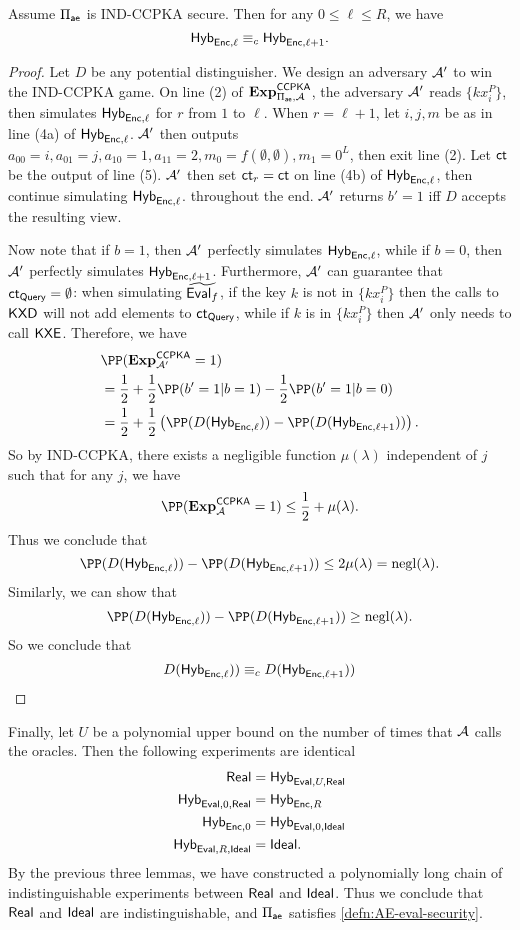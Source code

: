 \begin{lemma}
    Assume $\Pi_{\mathsf{ae}}$ is IND-CCPKA secure. Then for any $0 \leq \ell \leq R$, we have
    $$\mathsf{Hyb}_{\mathsf{Enc}, \ell} \equiv_c \mathsf{Hyb}_{\mathsf{Enc}, \ell + 1}.$$
\end{lemma}
\begin{proof}
    Let $D$ be any potential distinguisher. We design an adversary $\mathcal{A}'$ to win the IND-CCPKA game. On line (2) of $\mathbf{Exp}^{\mathsf{CCPKA}}_{\Pi_{\mathsf{ae}}, \mathcal{A}}$, the adversary $\mathcal{A}'$ reads $\{kx_i^P\}$, then simulates $\mathsf{Hyb}_{\mathsf{Enc}, \ell}$ for $r$ from $1$ to $\ell$. When $r = \ell + 1$, let $i, j, m$ be as in line (4a) of $\mathsf{Hyb}_{\mathsf{Enc}, \ell}$. $\mathcal{A}'$ then outputs $a_{00} = i, a_{01} = j, a_{10} = 1, a_{11} = 2, m_0 = f(\emptyset, \emptyset), m_1 = 0^L$, then exit line (2). Let $\mathsf{ct}$ be the output of line (5). $\mathcal{A}'$ then set $\mathsf{ct}_r = \mathsf{ct}$ on line (4b) of $\mathsf{Hyb}_{\mathsf{Enc}, \ell}$, then continue simulating $\mathsf{Hyb}_{\mathsf{Enc}, \ell}$. throughout the end. $\mathcal{A}'$ returns $b' = 1$ iff $D$ accepts the resulting view.

     Now note that if $b = 1$, then $\mathcal{A}'$ perfectly simulates $\mathsf{Hyb}_{\mathsf{Enc}, \ell}$, while if $b = 0$, then $\mathcal{A}'$ perfectly simulates $\mathsf{Hyb}_{\mathsf{Enc}, \ell+1}$. Furthermore, $\mathcal{A}'$ can guarantee that $\mathsf{ct}_{\mathsf{Query}} = \emptyset$: when simulating $\widetilde{\mathsf{Eval}_f}$, if the key $k$ is not in $\{kx_i^P\}$ then the calls to $\mathsf{KXD}$ will not add elements to $\mathsf{ct}_{\mathsf{Query}}$, while if $k$ is in $\{kx_i^P\}$ then $\mathcal{A}'$ only needs to call $\mathsf{KXE}$. Therefore, we have
    \begin{align*}
     &\PP(\mathbf{Exp}^{\mathsf{CCPKA}}_{ \cA'} = 1) \\
     &= \frac{1}{2} + \frac{1}{2}\PP(b' = 1 | b = 1) - \frac{1}{2}\PP(b' = 1 | b = 0) \\   
     &= \frac{1}{2} + \frac{1}{2}\left(\PP(D(\Hyb_{\enc, \ell})) - \PP(D(\Hyb_{\enc, \ell+1}))\right).
    \end{align*}
    So by IND-CCPKA, there exists a negligible function $\mu(\lambda)$ independent of $j$ such that for any $j$, we have
    $$\PP(\mathbf{Exp}^{\mathsf{CCPKA}}_{\cA} = 1) \leq \frac{1}{2} + \mu(\lambda).$$
    Thus we conclude that
    $$\PP(D(\Hyb_{\enc, \ell})) - \PP(D(\Hyb_{\enc, \ell+1})) \leq 2\mu(\lambda) = \negl(\lambda).$$
    Similarly, we can show that
    $$\PP(D(\Hyb_{\enc, \ell})) - \PP(D(\Hyb_{\enc, \ell+1})) \geq \negl(\lambda).$$
    So we conclude that
    $$D(\mathsf{Hyb}_{\mathsf{Enc}, \ell})) \equiv_c D(\mathsf{Hyb}_{\mathsf{Enc}, \ell + 1}))$$
\end{proof}
Finally, let $U$ be a polynomial upper bound on the number of times that $\mathcal{A}$ calls the oracles. Then the following experiments are identical
\begin{align*}
\mathsf{Real} &= \mathsf{Hyb}_{\mathsf{Eval}, U, \mathsf{Real}} \\
\mathsf{Hyb}_{\mathsf{Eval}, 0, \mathsf{Real}} &= \mathsf{Hyb}_{\mathsf{Enc}, R} \\
\mathsf{Hyb}_{\mathsf{Enc}, 0} &= \mathsf{Hyb}_{\mathsf{Eval}, 0, \mathsf{Ideal}} \\
\mathsf{Hyb}_{\mathsf{Eval}, R, \mathsf{Ideal}} &= \mathsf{Ideal}.
\end{align*}
By the previous three lemmas, we have constructed a polynomially long chain of indistinguishable experiments between $\mathsf{Real}$ and $\mathsf{Ideal}$. Thus we conclude that $\mathsf{Real}$ and $\mathsf{Ideal}$ are indistinguishable, and $\Pi_{\mathsf{ae}}$ satisfies \cref{defn:AE-eval-security}.